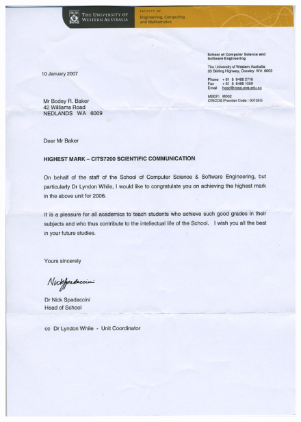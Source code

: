 \documentclass[10pt, a4paper]{report}
\begin{document}
\begin{figure}[h!]
   \centering
   \includegraphics{images/a_sci_com.pdf} 
\end{figure}
\end{document}
